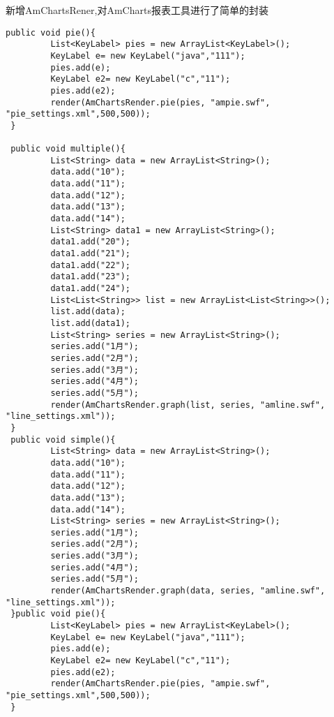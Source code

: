 \documentclass{scrartcl}
\begin{document}
新增AmChartsRener,对AmCharts报表工具进行了简单的封装


\begin{verbatim}
public void pie(){
         List<KeyLabel> pies = new ArrayList<KeyLabel>();
         KeyLabel e= new KeyLabel("java","111");
         pies.add(e);
         KeyLabel e2= new KeyLabel("c","11");
         pies.add(e2);
         render(AmChartsRender.pie(pies, "ampie.swf", "pie_settings.xml",500,500));
 }

 public void multiple(){
         List<String> data = new ArrayList<String>();
         data.add("10");
         data.add("11");
         data.add("12");
         data.add("13");
         data.add("14");
         List<String> data1 = new ArrayList<String>();
         data1.add("20");
         data1.add("21");
         data1.add("22");
         data1.add("23");
         data1.add("24");
         List<List<String>> list = new ArrayList<List<String>>();
         list.add(data);
         list.add(data1);
         List<String> series = new ArrayList<String>();
         series.add("1月");
         series.add("2月");
         series.add("3月");
         series.add("4月");
         series.add("5月");
         render(AmChartsRender.graph(list, series, "amline.swf", "line_settings.xml"));
 }
 public void simple(){
         List<String> data = new ArrayList<String>();
         data.add("10");
         data.add("11");
         data.add("12");
         data.add("13");
         data.add("14");
         List<String> series = new ArrayList<String>();
         series.add("1月");
         series.add("2月");
         series.add("3月");
         series.add("4月");
         series.add("5月");
         render(AmChartsRender.graph(data, series, "amline.swf", "line_settings.xml"));
 }public void pie(){
         List<KeyLabel> pies = new ArrayList<KeyLabel>();
         KeyLabel e= new KeyLabel("java","111");
         pies.add(e);
         KeyLabel e2= new KeyLabel("c","11");
         pies.add(e2);
         render(AmChartsRender.pie(pies, "ampie.swf", "pie_settings.xml",500,500));
 }


\end{verbatim}
\end{document}
